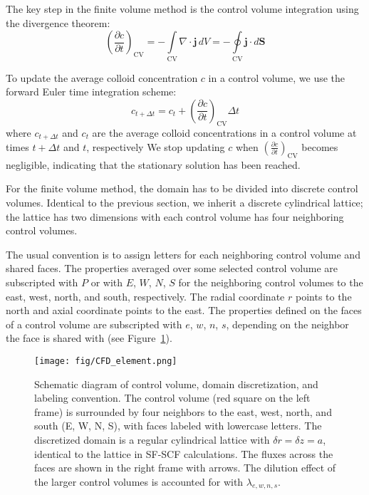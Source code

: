 \documentclass[10pt, a4paper]{article}
\begin{document}
\begin{multicols}{2}
The key step in the finite volume method is the control volume integration using the divergence theorem:
\begin{equation}
    \label{eq:CFD_integration_1}
    \left( \frac{\partial c}{\partial t} \right)_{\text{CV}} = -\int\limits_{\text{CV}} \nabla \cdot \bm{j} \, dV = -\oint\limits_{\text{CV}} \bm{j} \cdot d\bm{S}
\end{equation}

To update the average colloid concentration $c$ in a control volume, we use the forward Euler time integration scheme:
\begin{equation}
    c_{t + \Delta t} = c_t + \left( \frac{\partial c}{\partial t} \right)_{\text{CV}} \Delta t
\end{equation}
where $c_{t + \Delta t}$ and $c_t$ are the average colloid concentrations in a control volume at times $t + \Delta t$ and $t$, respectively
We stop updating $c$ when $\left( \frac{\partial c}{\partial t} \right)_{\text{CV}}$ becomes negligible, indicating that the stationary solution has been reached.

For the finite volume method, the domain has to be divided into discrete control volumes.
Identical to the previous section, we inherit a discrete cylindrical lattice; the lattice has two dimensions with each control volume has four neighboring control volumes.

The usual convention is to assign letters for each neighboring control volume and shared faces.
The properties averaged over some selected control volume are subscripted with $P$ or with $E$, $W$, $N$, $S$ for the neighboring control volumes to the east, west, north, and south, respectively.
The radial coordinate $r$ points to the north and axial coordinate points to the east.
The properties defined on the faces of a control volume are subscripted with $e$, $w$, $n$, $s$, depending on the neighbor the face is shared with (see Figure~\ref{fig:CFD_element}).


\begin{figure}[H]
    \centering
    \texttt{[image: fig/CFD\_element.png]}
    \caption{
        Schematic diagram of control volume, domain discretization, and labeling convention.
        The control volume (red square on the left frame) is surrounded by four neighbors to the east, west, north, and south (E, W, N, S), with faces labeled with lowercase letters.
        The discretized domain is a regular cylindrical lattice with $\delta r = \delta z = a$, identical to the lattice in SF-SCF calculations.
        The fluxes across the faces are shown in the right frame with arrows.
        The dilution effect of the larger control volumes is accounted for with $\lambda_{e,w,n,s}$.
        }
    \label{fig:CFD_element}
\end{figure}


\end{multicols}
\end{document}
